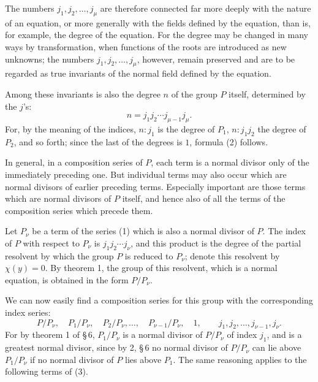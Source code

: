 \documentclass[11pt]{article}
\begin{document}
The numbers $j_1,j_2,\ldots,j_\mu$ are therefore connected far more deeply with the nature of an equation, or more generally with the fields defined by the equation, than is, for example, the degree of the equation. For the degree may be changed in many ways by transformation, when functions of the roots are introduced as new unknowns; the numbers $j_1,j_2,\ldots,j_\mu$, however, remain preserved and are to be regarded as true invariants of the normal field defined by the equation.

Among these invariants is also the degree $n$ of the group $P$ itself, determined by the $j$'s:
\begin{equation}
 n=j_1j_2\cdots j_{\mu-1}j_\mu .
 \tag{2}
\end{equation}
For, by the meaning of the indices, $n:j_1$ is the degree of $P_1$, $n:j_1j_2$ the degree of $P_2$, and so forth; since the last of the degrees is $1$, formula (2) follows.

In general, in a composition series of $P$, each term is a normal divisor only of the immediately preceding one. But individual terms may also occur which are normal divisors of earlier preceding terms. Especially important are those terms which are normal divisors of $P$ itself, and hence also of all the terms of the composition series which precede them.

Let $P_\nu$ be a term of the series (1) which is also a normal divisor of $P$. The index of $P$ with respect to $P_\nu$ is $j_1j_2\cdots j_\nu$, and this product is the degree of the partial resolvent by which the group $P$ is reduced to $P_\nu$; denote this resolvent by $\chi(y)=0$. By theorem 1, the group of this resolvent, which is a normal equation, is obtained in the form $P/P_\nu$.

We can now easily find a composition series for this group with the corresponding index series:
\begin{equation}
 P/P_\nu,\quad P_1/P_\nu,\quad P_2/P_\nu,\ldots,\quad P_{\nu-1}/P_\nu,\quad 1,
 \qquad j_1,j_2,\ldots,j_{\nu-1},j_\nu .
 \tag{3}
\end{equation}
For by theorem 1 of \S\,6, $P_1/P_\nu$ is a normal divisor of $P/P_\nu$ of index $j_1$, and is a greatest normal divisor, since by 2, \S\,6 no normal divisor of $P/P_\nu$ can lie above $P_1/P_\nu$ if no normal divisor of $P$ lies above $P_1$. The same reasoning applies to the following terms of (3).
\end{document}
